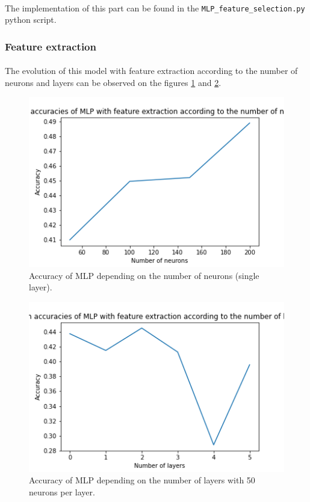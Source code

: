 \documentclass[a4paper, 11pt, oneside]{article}
\begin{document}
\paragraph{}The implementation of this part can be found in the \texttt{MLP\_feature\_selection.py} python script.

\subsubsection{Feature extraction} \label{subsubsec:mlp-feature-extraction}

\paragraph{}The evolution of this model with feature extraction according to the number of neurons and layers can be observed on the figures \ref{fig:mlp-feature-extraction-neurons} and \ref{fig:mlp-feature-extraction-layers}.

\begin{figure}[H]
\centering
\includegraphics[scale=0.4]{mlp/MLP_feature_extraction_neurons.png}
\caption{Accuracy of MLP depending on the number of neurons (single layer).}
\label{fig:mlp-feature-extraction-neurons}
\end{figure}
    
\begin{figure}[H]
\centering
\includegraphics[scale=0.4]{mlp/MLP_feature_extraction_layers.png}
\caption{Accuracy of MLP depending on the number of layers with 50 neurons per layer.}
\label{fig:mlp-feature-extraction-layers}
\end{figure}
\end{document}
